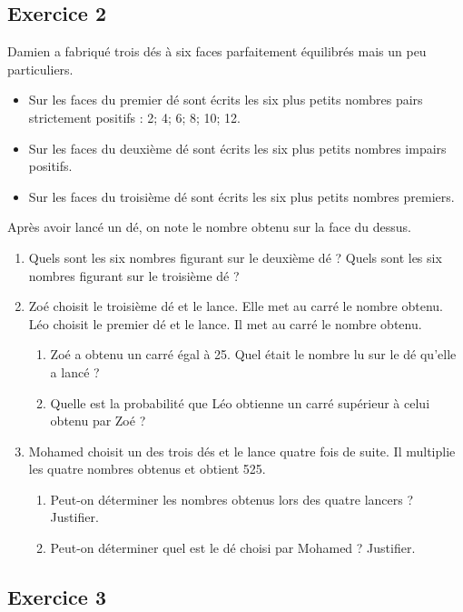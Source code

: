 \documentclass[10pt,a4paper,landscape]{article}
\begin{document}
\begin{multicols}{3}
\subsection*{Exercice 2}

Damien a fabriqué trois dés à six faces parfaitement équilibrés mais un peu particuliers.

\begin{itemize}
    \item Sur les faces du premier dé sont écrits les six plus petits nombres pairs strictement positifs : 2; 4; 6; 8; 10; 12.
    \item Sur les faces du deuxième dé sont écrits les six plus petits nombres impairs positifs. 
    \item Sur les faces du troisième dé sont écrits les six plus petits nombres premiers. 
\end{itemize}      
Après avoir lancé un dé, on note le nombre obtenu sur la face du dessus.

\begin{enumerate}
    \item Quels sont les six nombres figurant sur le deuxième dé ?
       Quels sont les six nombres figurant sur le troisième dé ?   
    \item Zoé choisit le troisième dé et le lance. Elle met au carré le nombre obtenu. Léo choisit le premier dé et le lance. Il met au carré le nombre obtenu.
    \begin{enumerate}
       \item Zoé a obtenu un carré égal à 25. Quel était le nombre lu sur le dé qu’elle a lancé ?
       \item Quelle est la probabilité que Léo obtienne un carré supérieur à celui obtenu par Zoé ?
    \end{enumerate}
    \item Mohamed choisit un des trois dés et le lance quatre fois de suite. Il multiplie les quatre nombres obtenus et obtient 525.
    \begin{enumerate}
       \item Peut-on déterminer les nombres obtenus lors des quatre lancers ? Justifier.
       \item Peut-on déterminer quel est le dé choisi par Mohamed ? Justifier. 
    \end{enumerate}
\end{enumerate}  \columnbreak 

\subsection*{Exercice 3}


\end{multicols}
\end{document}
